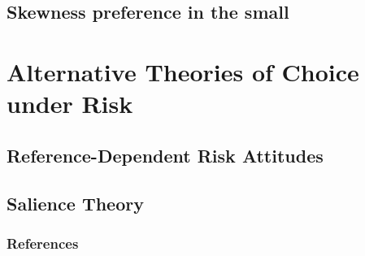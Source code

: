 \subsection{Skewness preference in the small}


\section{Alternative Theories of Choice under Risk}
\subsection{Reference-Dependent Risk Attitudes}
\subsection{Salience Theory}

\begin{frame}[allowframebreaks]
    \frametitle{References}
    \renewcommand{\bibfont}{\normalfont\footnotesize}
    \printbibliography
\end{frame}


